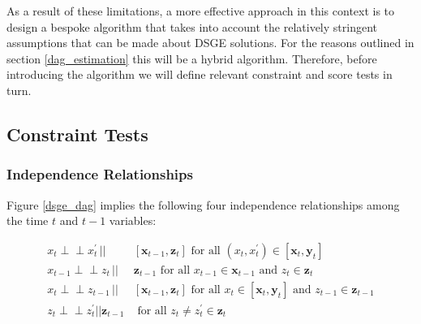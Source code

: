\documentclass{article}
\def\indep{\perp \!\!\! \perp}
\begin{document}
As a result of these limitations, a more effective approach in this context is to design a bespoke algorithm that takes into account the relatively stringent assumptions that can be made about DSGE solutions. For the reasons outlined in section \ref{dag_estimation} this will be a hybrid algorithm. Therefore, before introducing the algorithm we will define relevant constraint and score tests in turn.

\subsection{Constraint Tests} \label{constrainttests}

\subsubsection{Independence Relationships}

Figure \ref{dsge_dag} implies the following four independence relationships among the time $t$ and $t-1$ variables:

\begin{align}
  x_t \indep x^{\prime}_{t} \,||\,& [\mathbf{x}_{t-1},\mathbf{z}_t] \text{ for all } (x_t, x^{\prime}_{t}) \in [\mathbf{x}_t, \mathbf{y}_t] \label{constraint_test:1} \\
  x_{t-1} \indep z_{t} \,||\,& \mathbf{z}_{t-1} \text{ for all } x_{t-1} \in \mathbf{x}_{t-1} \text{ and } z_{t} \in \mathbf{z}_t \label{constraint_test:3} \\
  x_t \indep z_{t-1} \,||\,& [\mathbf{x}_{t-1}, \mathbf{z}_t] \text{ for all } x_t \in [\mathbf{x}_t, \mathbf{y}_t] \text{ and } z_{t-1} \in \mathbf{z}_{t-1} \label{constraint_test:2} \\
  z_t \indep z^{\prime}_{t} || \mathbf{z}_{t-1} & \text{ for all } z_t \not = z^{\prime}_{t} \in \mathbf{z}_t \label{constraint_test:4}
\end{align}
\end{document}
